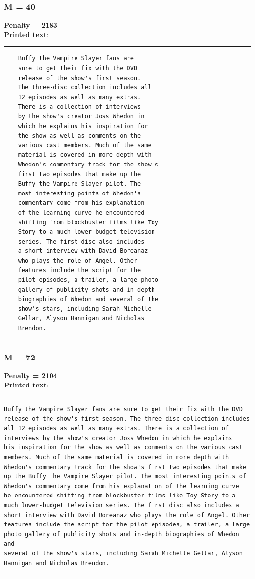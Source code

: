 \documentclass[conference]{styles/acmsiggraph}
\newcommand{\?}{\stackrel{?}{=}}
\begin{document}
\subsubsection*{M = 40}
\textbf{Penalty = 2183} \\
\textbf{Printed text}:\\
\rule{\textwidth}{0.4pt}
\begin{verbatim}
    Buffy the Vampire Slayer fans are 
    sure to get their fix with the DVD 
    release of the show's first season. 
    The three-disc collection includes all 
    12 episodes as well as many extras. 
    There is a collection of interviews 
    by the show's creator Joss Whedon in 
    which he explains his inspiration for 
    the show as well as comments on the 
    various cast members. Much of the same 
    material is covered in more depth with 
    Whedon's commentary track for the show's 
    first two episodes that make up the 
    Buffy the Vampire Slayer pilot. The 
    most interesting points of Whedon's 
    commentary come from his explanation 
    of the learning curve he encountered 
    shifting from blockbuster films like Toy 
    Story to a much lower-budget television 
    series. The first disc also includes 
    a short interview with David Boreanaz 
    who plays the role of Angel. Other 
    features include the script for the 
    pilot episodes, a trailer, a large photo 
    gallery of publicity shots and in-depth 
    biographies of Whedon and several of the 
    show's stars, including Sarah Michelle 
    Gellar, Alyson Hannigan and Nicholas 
    Brendon. 
\end{verbatim}
\rule{\textwidth}{0.4pt}

\newpage
\subsubsection*{M = 72}
\textbf{Penalty = 2104} \\
\textbf{Printed text}:\\
\rule{\textwidth}{0.4pt}
\begin{verbatim}
Buffy the Vampire Slayer fans are sure to get their fix with the DVD 
release of the show's first season. The three-disc collection includes 
all 12 episodes as well as many extras. There is a collection of 
interviews by the show's creator Joss Whedon in which he explains 
his inspiration for the show as well as comments on the various cast 
members. Much of the same material is covered in more depth with 
Whedon's commentary track for the show's first two episodes that make 
up the Buffy the Vampire Slayer pilot. The most interesting points of 
Whedon's commentary come from his explanation of the learning curve 
he encountered shifting from blockbuster films like Toy Story to a 
much lower-budget television series. The first disc also includes a 
short interview with David Boreanaz who plays the role of Angel. Other 
features include the script for the pilot episodes, a trailer, a large 
photo gallery of publicity shots and in-depth biographies of Whedon and 
several of the show's stars, including Sarah Michelle Gellar, Alyson 
Hannigan and Nicholas Brendon. 
\end{verbatim}
\rule{\textwidth}{0.4pt}
\end{document}
